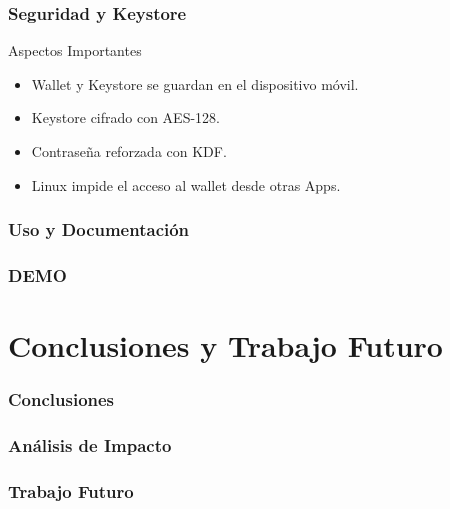 \documentclass[usenames,dvipsnames]{beamer}
\begin{document}
\begin{frame} 
\frametitle{Seguridad y Keystore} 
  \begin{block}{Aspectos Importantes}
    \begin{itemize}
      \item \textcolor{UniGold}{Wallet} y \textcolor{UniGold}{Keystore} se guardan en el dispositivo móvil.
      \item \textcolor{UniGold}{Keystore} cifrado con AES-128.
      \item \textcolor{UniGold}{Contraseña} reforzada con KDF.
      \item \textcolor{UniGold}{Linux} impide el acceso al wallet desde otras Apps.
    \end{itemize}
  \end{block}
\end{frame}

\begin{frame} 
\frametitle{Uso y Documentación} 
\end{frame}


\begin{frame} 
\frametitle{DEMO} 
\end{frame}


\section{Conclusiones y Trabajo Futuro}

\begin{frame} 
\frametitle{Conclusiones} 
\end{frame}

\begin{frame} 
\frametitle{Análisis de Impacto} 
\end{frame}

\begin{frame} 
\frametitle{Trabajo Futuro} 
\end{frame}
\end{document}
